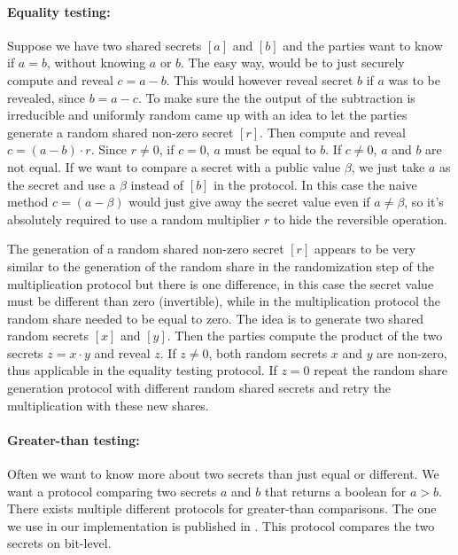 \paragraph{Equality testing:}
Suppose we have two shared secrets $[a]$ and $[b]$ and the parties want to know if $a = b$, without knowing $a$ or $b$.
The easy way, would be to just securely compute and reveal $c = a - b$. This would however reveal secret $b$ if $a$ was to be revealed, since $b = a - c$. To make sure the the output of the subtraction is irreducible and uniformly random \cite{franklin1996joint} came up with an idea to let the parties generate a random shared non-zero secret $[r]$.
Then compute and reveal $c = (a - b) \cdot r$. Since $r \neq 0$, if $c = 0$, $a$ must be equal to $b$. If $c \neq 0$, $a$ and $b$ are not equal. If we want to compare a secret with a public value $\beta$, we just take $a$ as the secret and use a $\beta$ instead of $[b]$ in the protocol. In this case the naive method $c = (a - \beta)$ would just give away the secret value even if $a \neq \beta$, so it's absolutely required to use a random multiplier $r$ to hide the reversible operation.

The generation of a random shared non-zero secret $[r]$ appears to be very similar to the generation of the random share in the randomization step of the multiplication protocol but there is one difference, in this case the secret value must be different than zero (invertible), while in the multiplication protocol the random share needed to be equal to zero. The idea is to generate two shared random secrets $[x]$ and $[y]$. Then the parties compute the product of the two secrets $z = x \cdot y$ and reveal $z$. If $z \neq 0$, both random secrets $x$ and $y$ are non-zero, thus applicable in the equality testing protocol. If $z = 0$ repeat the random share generation protocol with different random shared secrets and retry the multiplication with these new shares.

\paragraph{Greater-than testing:}
Often we want to know more about two secrets than just equal or different. We want a protocol comparing two secrets $a$ and $b$ that returns a boolean for $a>b$. There exists multiple different protocols for greater-than comparisons. The one we use in our implementation is published in \cite{erkin2009privacy}. This protocol compares the two secrets on bit-level.

